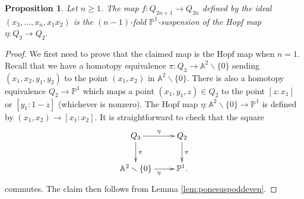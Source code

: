 \documentclass[10pt,a4paper]{amsart}
\newtheorem{prop}{Proposition}
\newcommand{\A}{{\mathbb A}}
\newcommand{\pone}{{\mathbb P}^1}
\begin{document}
\begin{prop}
\label{prop:etasusp}
Let $n\geq 1$. The map $f\colon Q_{2n+1} \to Q_{2n}$ defined by the ideal $(x_3, \ldots, x_n, x_1x_2)$ is the $(n-1)$-fold $\mathbb{P}^1$-suspension of the Hopf map $\eta \colon Q_3 \to Q_2.$


\end{prop}

\begin{proof}
We first need to prove that the claimed map is the Hopf map when $n=1$. Recall that we have a homotopy equivalence $\pi \colon Q_3 \to \A^2 \smallsetminus\{0\}$ sending $(x_1,x_2,y_1,y_2)$ to the point $(x_1,x_2)$ in $\A^2 \smallsetminus\{0\}$. There is also a homotopy equivalence $Q_2 \to \pone$ which maps a point $(x_1,y_1,z) \in Q_2$ to the point $[z:x_1]$ or $[y_1 : 1-z]$ (whichever is nonzero). The Hopf map $\eta\colon \A^2 \smallsetminus\{0\} \to \pone$ is defined by $(x_1,x_2) \to [x_1:x_2]$. It is straightforward to check that the square 
\begin{equation*}
    \xymatrix{Q_3\ar[r]^\eta\ar[d]^\pi & Q_2\ar[d]^\pi \\
\A^2 \smallsetminus\{0\} \ar[r]_{\eta} & \mathbb{P}^1.}
\end{equation*}
commutes. The claim then follows from Lemma \ref{lem:ponesuspoddeven}.

\end{proof}
\end{document}
